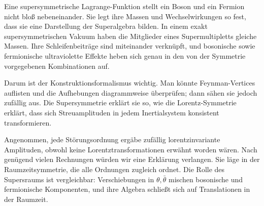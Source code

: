 Eine supersymmetrische Lagrange-Funktion stellt ein Boson und ein Fermion nicht bloß nebeneinander. Sie legt ihre Massen und Wechselwirkungen so fest, dass sie eine Darstellung der Superalgebra bilden. In einem exakt supersymmetrischen Vakuum haben die Mitglieder eines Supermultipletts gleiche Massen. Ihre Schleifenbeiträge sind miteinander verknüpft, und bosonische sowie fermionische ultraviolette Effekte heben sich genau in den von der Symmetrie vorgegebenen Kombinationen auf.

Darum ist der Konstruktionsformalismus wichtig. Man könnte Feynman-Vertices auflisten und die Aufhebungen diagrammweise überprüfen; dann sähen sie jedoch zufällig aus. Die Supersymmetrie erklärt sie so, wie die Lorentz-Symmetrie erklärt, dass sich Streuamplituden in jedem Inertialsystem konsistent transformieren.


\begin{classroomqa}
\end{classroomqa}

\begin{classroomqa}
\end{classroomqa}

Angenommen, jede Störungsordnung ergäbe zufällig lorentzinvariante Amplituden, obwohl keine Lorentztransformationen erwähnt worden wären. Nach genügend vielen Rechnungen würden wir eine Erklärung verlangen. Sie läge in der Raumzeitsymmetrie, die alle Ordnungen zugleich ordnet. Die Rolle des Supersraums ist vergleichbar: Verschiebungen in \(\theta,\bar\theta\) mischen bosonische und fermionische Komponenten, und ihre Algebra schließt sich auf Translationen in der Raumzeit.

